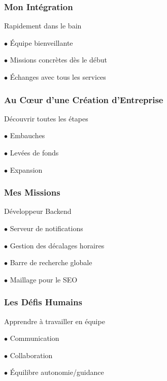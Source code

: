 \documentclass{beamer}
\begin{document}
\begin{frame}
\frametitle{Mon Intégration}
\begin{center}
{\Large Rapidement dans le bain}

\vspace{1cm}
$\bullet$ Équipe bienveillante

\vspace{0.5cm}
$\bullet$ Missions concrètes dès le début

\vspace{0.5cm}
$\bullet$ Échanges avec tous les services
\end{center}
\end{frame}

\begin{frame}
\frametitle{Au Cœur d'une Création d'Entreprise}
\begin{center}
{\Large Découvrir toutes les étapes}

\vspace{1cm}
$\bullet$ Embauches

\vspace{0.5cm}
$\bullet$ Levées de fonds

\vspace{0.5cm}
$\bullet$ Expansion
\end{center}
\end{frame}

\begin{frame}
\frametitle{Mes Missions}
\begin{center}
{\Large Développeur Backend}

\vspace{1cm}
$\bullet$ Serveur de notifications

\vspace{0.5cm}
$\bullet$ Gestion des décalages horaires

\vspace{0.5cm}
$\bullet$ Barre de recherche globale

\vspace{0.5cm}
$\bullet$ Maillage pour le SEO
\end{center}
\end{frame}

\begin{frame}
\frametitle{Les Défis Humains}
\begin{center}
{\Large Apprendre à travailler en équipe}

\vspace{1cm}
$\bullet$ Communication

\vspace{0.5cm}
$\bullet$ Collaboration

\vspace{0.5cm}
$\bullet$ Équilibre autonomie/guidance
\end{center}
\end{frame}
\end{document}
